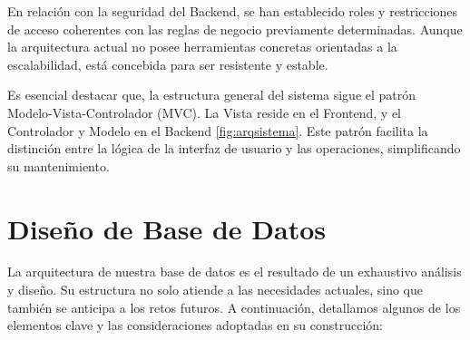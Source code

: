 En relación con la seguridad del Backend, se han establecido roles y restricciones de acceso coherentes con las reglas de negocio previamente determinadas. Aunque la arquitectura actual no posee herramientas concretas orientadas a la escalabilidad, está concebida para ser resistente y estable.

Es esencial destacar que, la estructura general del sistema sigue el patrón Modelo-Vista-Controlador (MVC). La Vista reside en el Frontend, y el Controlador y Modelo en el Backend \ref{fig:arqsistema}. Este patrón facilita la distinción entre la lógica de la interfaz de usuario y las operaciones, simplificando su mantenimiento.

\section{Diseño de Base de Datos}

La arquitectura de nuestra base de datos es el resultado de un exhaustivo análisis y diseño. Su estructura no solo atiende a las necesidades actuales, sino que también se anticipa a los retos futuros. A continuación, detallamos algunos de los elementos clave y las consideraciones adoptadas en su construcción:

